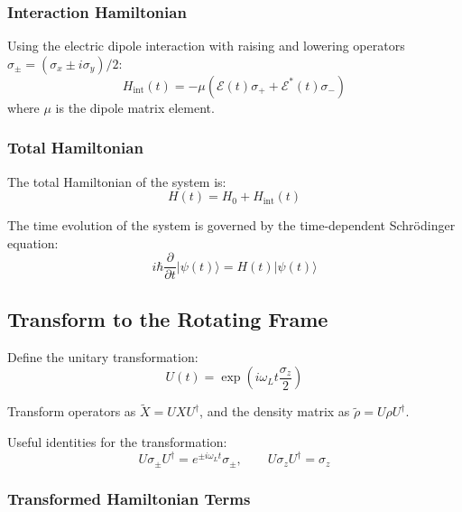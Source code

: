 \subsubsection{Interaction Hamiltonian}
Using the electric dipole interaction with raising and lowering operators \(\sigma_\pm = (\sigma_x \pm i\sigma_y)/2\):
\begin{equation}
	H_{\text{int}}(t) = -\mu \left( \mathcal{E}(t) \sigma_+ + \mathcal{E}^*(t) \sigma_- \right)
	\label{eq:InteractionHamiltonianDipole}
\end{equation}
where \(\mu\) is the dipole matrix element.

\subsubsection{Total Hamiltonian}
The total Hamiltonian of the system is:
\begin{equation}
	H(t) = H_0 + H_{\text{int}}(t)
	\label{eq:TotalHamiltonian}
\end{equation}

The time evolution of the system is governed by the time-dependent Schrödinger equation:
\begin{equation}
	i\hbar \frac{\partial}{\partial t} |\psi(t)\rangle = H(t) |\psi(t)\rangle
	\label{eq:SchrodingerEquation}
\end{equation}

\subsection{Transform to the Rotating Frame}

Define the unitary transformation:
\begin{equation}
	U(t) = \exp\left(i \omega_L t \frac{\sigma_z}{2}\right)
	\label{eq:UnitaryRotatingFrame}
\end{equation}

Transform operators as \(\tilde{X} = U X U^\dagger\), and the density matrix as \(\tilde{\rho} = U \rho U^\dagger\).

Useful identities for the transformation:
\begin{equation}
	U \sigma_\pm U^\dagger = e^{\pm i \omega_L t} \sigma_\pm, \qquad
	U \sigma_z U^\dagger = \sigma_z
	\label{eq:TransformationIdentities}
\end{equation}

\subsubsection{Transformed Hamiltonian Terms}

